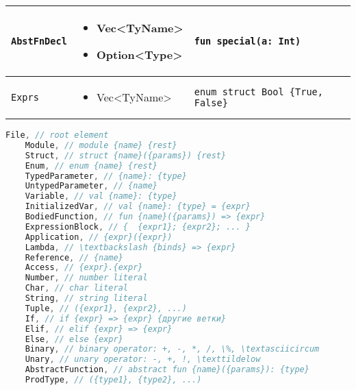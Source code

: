 \begin{table}[H]
\begin{tabular}{|p{}|p{}|p{}|}
        \texttt{AbstFnDecl} & \begin{itemize} \item Vec<TyName> \item Option<Type> \end{itemize} & \verb|fun special(a: Int)| \\\hline
        \texttt{Exprs} & \begin{itemize} \item Vec<TyName> \end{itemize} & \verb|enum struct Bool {True, False}| \\\hline
    \end{tabular}
\end{table}

\begin{lstlisting}[label=lst:nodes, caption={Имена всех вершин, составляющих абстрактное синтаксическое дерево}, language=C]
    File, // root element
    Module, // module {name} {rest}
    Struct, // struct {name}({params}) {rest}
    Enum, // enum {name} {rest}
    TypedParameter, // {name}: {type}
    UntypedParameter, // {name}
    Variable, // val {name}: {type}
    InitializedVar, // val {name}: {type} = {expr}
    BodiedFunction, // fun {name}({params}) => {expr}
    ExpressionBlock, // {  {expr1}; {expr2}; ... }
    Application, // {expr}({expr})
    Lambda, // \textbackslash {binds} => {expr}
    Reference, // {name}
    Access, // {expr}.{expr}
    Number, // number literal
    Char, // char literal
    String, // string literal
    Tuple, // ({expr1}, {expr2}, ...)
    If, // if {expr} => {expr} {другие ветки}
    Elif, // elif {expr} => {expr}
    Else, // else {expr}
    Binary, // binary operator: +, -, *, /, \%, \textasciicircum
    Unary, // unary operator: -, +, !, \texttildelow
    AbstractFunction, // abstract fun {name}({params}): {type}
    ProdType, // ({type1}, {type2}, ...)
\end{lstlisting}